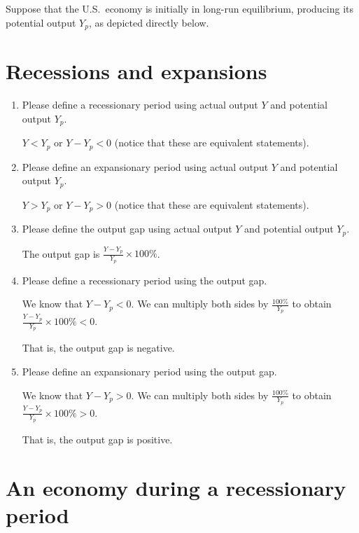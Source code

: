 \documentclass{assignment}
\date{Friday 9 December 2022}
\begin{document}
\RaggedRight

\beginsolutions{}

Suppose that the U.S.~economy is initially in long-run equilibrium, producing its potential output $Y_p$, as depicted directly below.

\section{Recessions and expansions}

\begin{enumerate}
\item Please define a recessionary period using actual output $Y$ and potential output $Y_p$.
\begin{solution}
$Y<Y_p$ or $Y-Y_p<0$ (notice that these are equivalent statements).
\end{solution}
\item Please define an expansionary period using actual output $Y$ and potential output $Y_p$.
\begin{solution}
$Y>Y_p$ or $Y-Y_p>0$ (notice that these are equivalent statements).
\end{solution}
\item Please define the output gap using actual output $Y$ and potential output $Y_p$.
\begin{solution}
The output gap is $\frac{Y-Y_p}{Y_p}\times100\%$.
\end{solution}
\item Please define a recessionary period using the output gap.
\begin{solution}
We know that $Y-Y_p<0$. We can multiply both sides by $\frac{100\%}{Y_p}$ to obtain $\frac{Y-Y_p}{Y_p}\times100\%<0$.

That is, the output gap is negative.
\end{solution}
\item Please define an expansionary period using the output gap.
\begin{solution}
We know that $Y-Y_p>0$. We can multiply both sides by $\frac{100\%}{Y_p}$ to obtain $\frac{Y-Y_p}{Y_p}\times100\%>0$.

That is, the output gap is positive.
\end{solution}
\end{enumerate}

\section{An economy during a recessionary period\label{sec:recession}}
\end{document}
